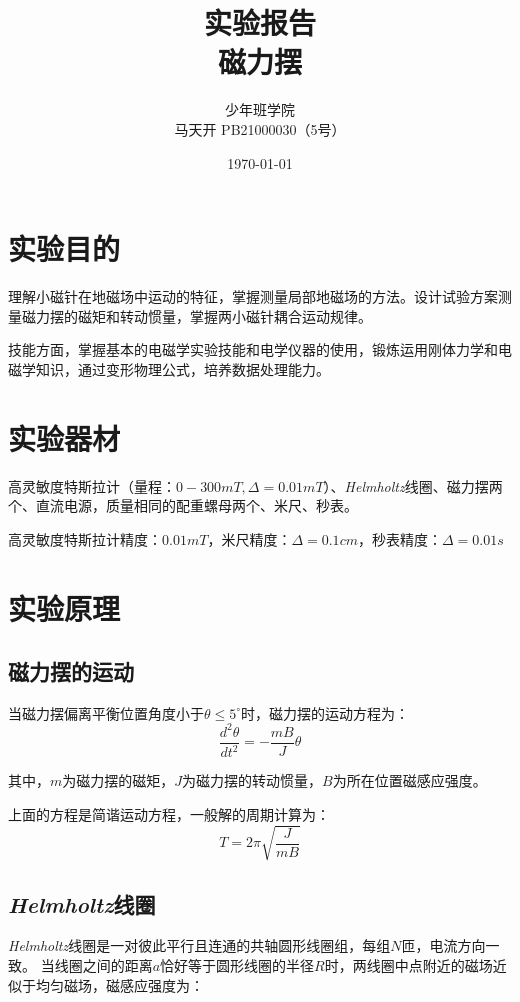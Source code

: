 \documentclass[a4paper]{ltxdoc}
\title{实验报告\\磁力摆}
\author{少年班学院\\马天开 PB21000030（5号）}
\date{\today}
\begin{document}
\begin{multicols}{2}
    \maketitle
    \section{实验目的}

    理解小磁针在地磁场中运动的特征，掌握测量局部地磁场的方法。设计试验方案测量磁力摆的磁矩和转动惯量，掌握两小磁针耦合运动规律。

    技能方面，掌握基本的电磁学实验技能和电学仪器的使用，锻炼运用刚体力学和电磁学知识，通过变形物理公式，培养数据处理能力。

    \section{实验器材}

    高灵敏度特斯拉计（量程：$0-300mT,\Delta = 0.01mT$）、\textit{Helmholtz}线圈、磁力摆两个、直流电源，质量相同的配重螺母两个、米尺、秒表。

    高灵敏度特斯拉计精度：$0.01mT$，米尺精度：$\Delta = 0.1cm$，秒表精度：$\Delta = 0.01s$

    \section{实验原理}

    \subsection{磁力摆的运动}

    当磁力摆偏离平衡位置角度小于$\theta \leq 5^{\circ}$时，磁力摆的运动方程为：
    \begin{equation}
        \dfrac{d^2\theta}{dt^2} = -\dfrac{mB}{J}\theta
    \end{equation}

    其中，$m$为磁力摆的磁矩，$J$为磁力摆的转动惯量，$B$为所在位置磁感应强度。

    上面的方程是简谐运动方程，一般解的周期计算为：
    \begin{equation}
        T = 2\pi \sqrt{\dfrac{J}{mB}}
        \label{eq:T}
    \end{equation}
    \subsection{\textit{Helmholtz}线圈}
    \textit{Helmholtz}线圈是一对彼此平行且连通的共轴圆形线圈组，每组$N$匝，电流方向一致。
    当线圈之间的距离$a$恰好等于圆形线圈的半径$R$时，两线圈中点附近的磁场近似于均匀磁场，磁感应强度为：


\end{multicols}
\end{document}
